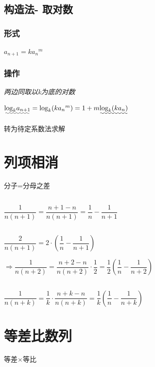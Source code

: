 \documentclass[10pt,cn]{elegantbook}
\begin{document}
  \subsection{构造法-	取对数 }
\subsubsection*{形式}
$a_{n+1}=k {a_{n}}^{m}$

\subsubsection*{操作}

\textit{两边同取以k为底的对数}

$\uwave{{\log}_{k} a_{n+1}}={\log}_{k} (k{a_{n}}^{m})=1+m\uwave{ {\log}_{k} (k{a_{n}})}$

转为待定系数法求解

\section{列项相消}
分子=分母之差

\subsection*{}

$\dfrac{1}{n(n+1)}=\dfrac{n+1-n}{n(n+1)}=\dfrac{1}{n}-\dfrac{1}{n+1}$

\subsection*{}

$\dfrac{2}{n(n+1)}=2\cdot (\dfrac{1}{n}-\dfrac{1}{n+1})$

$\Rightarrow \dfrac{1}{n(n+2)}=\dfrac{n+2-n}{n(n+2)}\cdot \dfrac{1}{2}=\dfrac{1}{2}(\dfrac{1}{n}-\dfrac{1}{n+2})$

\subsection*{}

$\dfrac{1}{n(n+k)}=\dfrac{1}{k}\cdot \dfrac{n+k-n}{n(n+k)}=\dfrac{1}{k}(\dfrac{1}{n}-\dfrac{1}{n+k})$

\section{等差比数列}

等差$\times$等比
\end{document}
